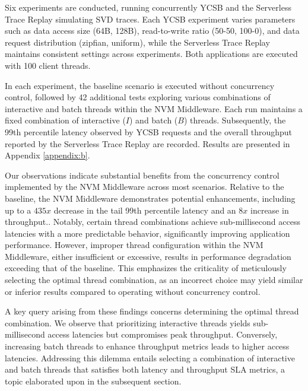 Six experiments are conducted, running concurrently YCSB and the Serverless Trace Replay simulating SVD traces. Each YCSB experiment varies parameters such as data access size (64B, 128B), read-to-write ratio (50-50, 100-0), and data request distribution (zipfian, uniform), while the Serverless Trace Replay maintains consistent settings across experiments. Both applications are executed with 100 client threads.

In each experiment, the baseline scenario is executed without concurrency control, followed by 42 additional tests exploring various combinations of interactive and batch threads within the NVM Middleware. Each run maintains a fixed combination of interactive ($I$) and batch ($B$) threads. Subsequently, the 99th percentile latency observed by YCSB requests and the overall throughput reported by the Serverless Trace Replay are recorded. Results are presented in Appendix \ref{appendix:b}.

Our observations indicate substantial benefits from the concurrency control implemented by the NVM Middleware across most scenarios. Relative to the baseline, the NVM Middleware demonstrates potential enhancements,  including up to a $435x$ decrease in the tail 99th percentile latency and an $8x$ increase in throughput.. Notably, certain thread combinations achieve sub-millisecond access latencies with a more predictable behavior, significantly improving application performance. However, improper thread configuration within the NVM Middleware, either insufficient or excessive, results in performance degradation exceeding that of the baseline. This emphasizes the criticality of meticulously selecting the optimal thread combination, as an incorrect choice may yield similar or inferior results compared to operating without concurrency control.

A key query arising from these findings concerns determining the optimal thread combination. We observe that prioritizing interactive threads yields sub-millisecond access latencies but compromises peak throughput. Conversely, increasing batch threads to enhance throughput metrics leads to higher access latencies. Addressing this dilemma entails selecting a combination of interactive and batch threads that satisfies both latency and throughput SLA metrics, a topic elaborated upon in the subsequent section.


